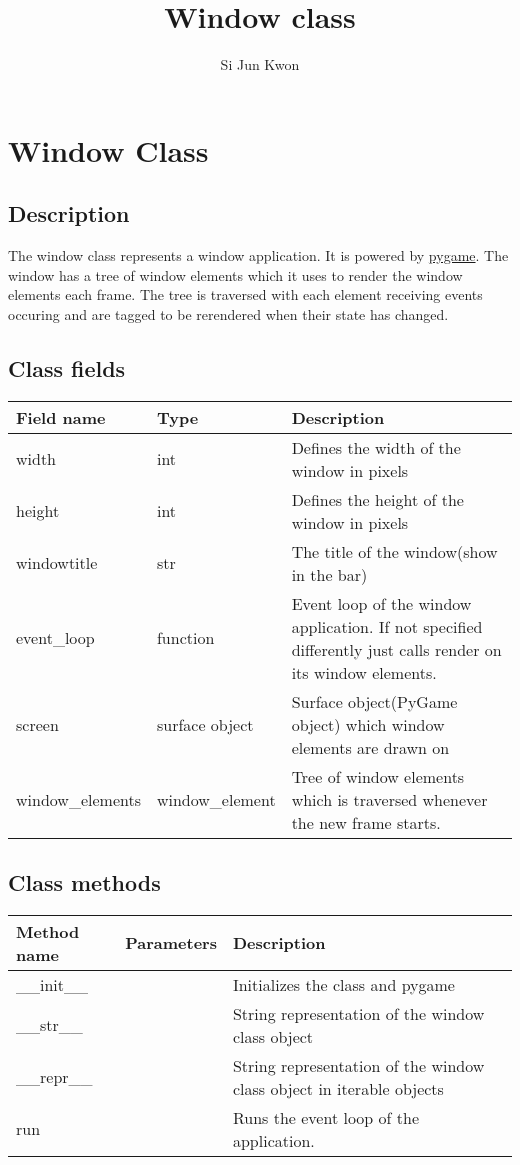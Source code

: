 \documentclass{scrartcl}
\author{Si Jun Kwon}
\title{Window class}
\begin{document}
    \maketitle
    \tableofcontents
    \newpage
    \section{Window Class}
    \subsection{Description}
    The window class represents a window application. It is powered by \href{https://www.pygame.org/}{pygame}. The window has a tree of window elements which
    it uses to render the window elements each frame. The tree is traversed with each element receiving
    events occuring and are tagged to be rerendered when their state has changed.
    \subsection{Class fields}
    \begin{tabular}{|p{}|p{}|p{}|}
        \hline
        Field name & Type & Description\\
        \hline
        width & int & Defines the width of the window in pixels\\
        \hline
        height & int & Defines the height of the window in pixels\\
        \hline
        windowtitle & str & The title of the window(show in the bar)\\
        \hline
        event\_loop & function & Event loop of the window application. If not specified differently just calls render on its window elements.\\
        \hline
        screen & surface object & Surface object(PyGame object) which window elements are drawn on\\
        \hline
        window\_elements & window\_element& Tree of window elements which is traversed whenever the new frame starts.\\
        \hline
    \end{tabular}
    \subsection{Class methods}
    \begin{tabular}{|p{}|p{}|p{}|}
        \hline
        Method name & Parameters & Description\\
        \hline
        \_\_init\_\_ &  & Initializes the class and pygame\\
        \hline
        \_\_str\_\_ & &String representation of the window class object\\
        \hline
        \_\_repr\_\_ & & String representation of the window class object in iterable objects\\
        \hline
        run & & Runs the event loop of the application.\\
        \hline
    \end{tabular}
\end{document}
